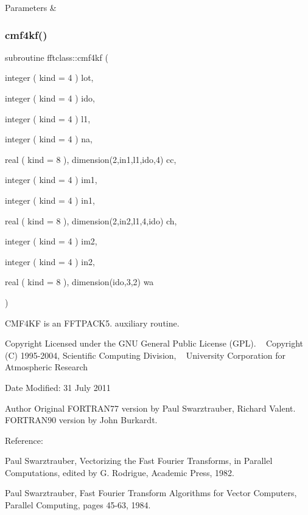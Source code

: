 \begin{DoxyParams}{Parameters}
{\em } & \\
\hline
\end{DoxyParams}
\mbox{\label{namespacefftclass_acdd67c6a77ecec55c036ab8899c07dee}} 
\subsubsection{\texorpdfstring{cmf4kf()}{cmf4kf()}}
{\footnotesize\ttfamily subroutine fftclass\+::cmf4kf (\begin{DoxyParamCaption}\item[{integer ( kind = 4 )}]{lot,  }\item[{integer ( kind = 4 )}]{ido,  }\item[{integer ( kind = 4 )}]{l1,  }\item[{integer ( kind = 4 )}]{na,  }\item[{real ( kind = 8 ), dimension(2,in1,l1,ido,4)}]{cc,  }\item[{integer ( kind = 4 )}]{im1,  }\item[{integer ( kind = 4 )}]{in1,  }\item[{real ( kind = 8 ), dimension(2,in2,l1,4,ido)}]{ch,  }\item[{integer ( kind = 4 )}]{im2,  }\item[{integer ( kind = 4 )}]{in2,  }\item[{real ( kind = 8 ), dimension(ido,3,2)}]{wa }\end{DoxyParamCaption})}



C\+M\+F4\+KF is an F\+F\+T\+P\+A\+C\+K5. auxiliary routine. 

\begin{DoxyCopyright}{Copyright}
Licensed under the G\+NU General Public License (G\+PL). ~\newline
 Copyright (C) 1995-\/2004, Scientific Computing Division, ~\newline
 University Corporation for Atmospheric Research 
\end{DoxyCopyright}
\begin{DoxyDate}{Date}
Modified\+: 31 July 2011 
\end{DoxyDate}
\begin{DoxyAuthor}{Author}
Original F\+O\+R\+T\+R\+A\+N77 version by Paul Swarztrauber, Richard Valent. ~\newline
 F\+O\+R\+T\+R\+A\+N90 version by John Burkardt.
\end{DoxyAuthor}
\begin{DoxyVerb}  Reference:

    Paul Swarztrauber,
    Vectorizing the Fast Fourier Transforms,
    in Parallel Computations,
    edited by G. Rodrigue,
    Academic Press, 1982.

    Paul Swarztrauber,
    Fast Fourier Transform Algorithms for Vector Computers,
    Parallel Computing, pages 45-63, 1984.\end{DoxyVerb}
 
